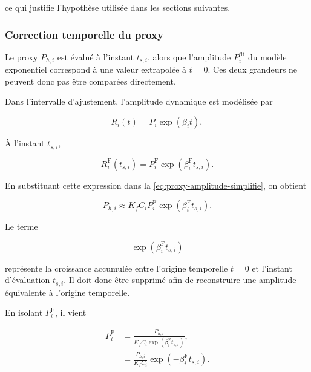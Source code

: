 \documentclass[
    11pt,
    a4paper
]{article}
\begin{document}
ce qui justifie l'hypothèse utilisée dans les sections suivantes.


\subsubsection{Correction temporelle du proxy}
\label{subsubsec:correction-temporelle-proxy}

Le proxy \(P_{h,i}\) est évalué à l’instant \(t_{s,i}\), alors que l’amplitude
$P_i^{\mathrm{fit}}$ du modèle exponentiel correspond à une valeur extrapolée à \(t=0\).
Ces deux grandeurs ne peuvent donc pas être comparées directement.

Dans l’intervalle d’ajustement, l’amplitude dynamique est modélisée par

\begin{equation}
    R_i(t)
    =
    P_i\exp\left(\beta_i t\right),
    \label{eq:modele-exp-correction-proxy}
\end{equation}


À l’instant \(t_{s,i}\),

\begin{equation}
    R_i^{\mathrm{F}}(t_{s,i})
    =
    P_i^{\mathrm{F}}\exp\left(\beta_i^{\mathrm{F}} t_{s,i}\right).
    \label{eq:amplitude-ts-correction}
\end{equation}

En substituant cette expression dans la
\eqref{eq:proxy-amplitude-simplifie}, on obtient

\begin{equation}
    P_{h,i}
    \approx
    K_f C_i P_i^{\mathrm{F}}
    \exp\left(\beta_i^{\mathrm{F}} t_{s,i}\right).
    \label{eq:proxy-avec-croissance}
\end{equation}

Le terme

\begin{equation}
    \exp\left(\beta_i^{\mathrm{F}} t_{s,i}\right)
\end{equation}

représente la croissance accumulée entre l’origine temporelle \(t=0\) et
l’instant d’évaluation \(t_{s,i}\). Il doit donc être supprimé afin de
reconstruire une amplitude équivalente à l’origine temporelle.

En isolant \(P_i^{\mathrm{F}}\), il vient

\begin{align}
    P_i^{\mathrm{F}}
    &=
    \frac{P_{h,i}}
    {K_f C_i
    \exp\left(\beta_i^{\mathrm{F}} t_{s,i}\right)},
    \nonumber\\
    &=
    \frac{P_{h,i}}{K_f C_i}
    \exp\left(-\beta_i^{\mathrm{F}} t_{s,i}\right).
    \label{eq:Pi-reconstruit-force}
\end{align}
\end{document}
